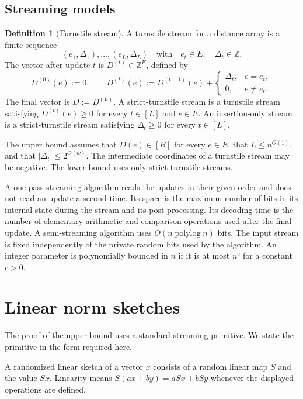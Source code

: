 \documentclass[11pt]{article}
\theoremstyle{definition}
\newtheorem{definition}[theorem]{Definition}
\newcommand{\Z}{\mathbb{Z}}
\newcommand{\polylog}{\operatorname{polylog}}
\begin{document}
\subsection{Streaming models}

\begin{definition}[Turnstile stream]
A turnstile stream for a distance array is a finite sequence
\[
 (e_1,\Delta_1),\ldots,(e_L,\Delta_L)
 \quad\text{with}\quad
 e_t\in E,
 \quad
 \Delta_t\in\Z.
\]
The vector after update \(t\) is \(D^{(t)}\in\Z^E\), defined by
\[
 D^{(0)}(e):=0,
 \qquad
 D^{(t)}(e):=D^{(t-1)}(e)+
 \begin{cases}
 \Delta_t,&e=e_t,\\
 0,&e\ne e_t.
 \end{cases}
\]
The final vector is \(D:=D^{(L)}\).  A strict-turnstile stream is a turnstile
stream satisfying \(D^{(t)}(e)\ge0\) for every \(t\in[L]\) and \(e\in E\).
An insertion-only stream is a strict-turnstile stream satisfying
\(\Delta_t\ge0\) for every \(t\in[L]\).
\end{definition}

The upper bound assumes that \(D(e)\in[B]\) for every \(e\in E\), that
\(L\le n^{O(1)}\), and that \(|\Delta_t|\le 2^{O(w)}\).  The intermediate
coordinates of a turnstile stream may be negative.  The lower bound uses only
strict-turnstile streams.

A one-pass streaming algorithm reads the updates in their given order and
does not read an update a second time.  Its space is the maximum number of bits
in its internal state during the stream and its post-processing.  Its decoding
time is the number of elementary arithmetic and comparison operations used
after the final update.  A semi-streaming algorithm uses
\(O(n\polylog n)\) bits.  The input stream is fixed independently of the
private random bits used by the algorithm.
An integer parameter is polynomially bounded in \(n\) if it is at most
\(n^c\) for a constant \(c>0\).

\section{Linear norm sketches}\label{sec:sketches}

The proof of the upper bound uses a standard streaming primitive.  We state
the primitive in the form required here.

A randomized linear sketch of a vector \(x\) consists of a random linear map
\(S\) and the value \(Sx\).  Linearity means
\(S(ax+by)=aSx+bSy\) whenever the displayed operations are defined.
\end{document}
